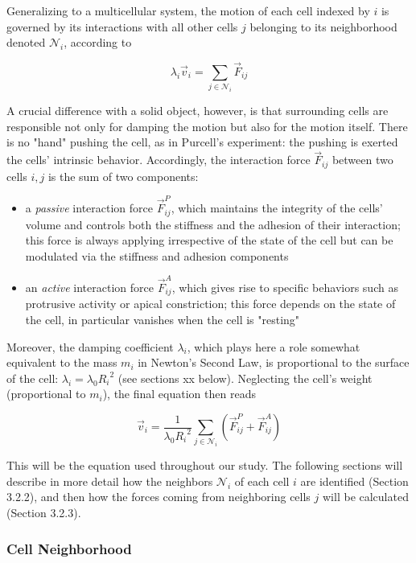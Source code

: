 Generalizing to a multicellular system, the motion of each cell indexed by $i$ is governed by its interactions with all other cells $j$ belonging to its neighborhood denoted $\mathcal{N}_i$, according to

$$\lambda_i \vec{v}_{i} = \sum_{j \in \mathcal{N}_i} \vec{F}_{ij}$$

A crucial difference with a solid object, however, is that surrounding cells are responsible not only for damping the motion but also for the motion itself. There is no "hand" pushing the cell, as in Purcell's experiment: the pushing is exerted the cells' intrinsic behavior. Accordingly, the interaction force $\vec{F}_{ij}$ between two cells $i,j$ is the sum of two components:
\begin{itemize}
	\item a \textit{passive} interaction force $\vec{F}^P_{ij}$, which maintains the integrity of the cells' volume and controls both the stiffness and the adhesion of their interaction; this force is always applying irrespective of the state of the cell but can be modulated via the stiffness and adhesion components
	\item an \textit{active} interaction force $\vec{F}^A_{ij}$, which gives rise to specific behaviors such as protrusive activity or apical constriction; this force depends on the state of the cell, in particular vanishes when the cell is "resting"
\end{itemize}

Moreover, the damping coefficient $\lambda_i$, which plays here a role somewhat equivalent to the mass $m_i$ in Newton's Second Law, is proportional to the surface of the cell: $\lambda_i = \lambda_0 {R_i}^2$ (see sections xx below). Neglecting the cell's weight (proportional to $m_i$), the final equation then reads

$$\vec{v}_{i} =  \frac{1}{\lambda_0 {R_i}^2} \sum_{j \in \mathcal{N}_i} \left( \vec{F}^P_{ij} + \vec{F}^A_{ij} \right)$$

This will be the equation used throughout our study. The following sections will describe in more detail how the neighbors $\mathcal{N}_i$ of each cell $i$ are identified (Section 3.2.2), and then how the forces coming from neighboring cells $j$ will be calculated (Section 3.2.3).


\subsubsection{Cell Neighborhood}


